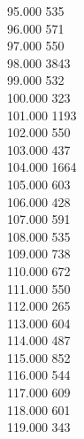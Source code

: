 { 95.000	535 \\
 96.000	571 \\
 97.000	550 \\
 98.000	3843 \\
 99.000	532 \\
 100.000	323 \\
 101.000	1193 \\
 102.000	550 \\
 103.000	437 \\
 104.000	1664 \\
 105.000	603 \\
 106.000	428 \\
 107.000	591 \\
 108.000	535 \\
 109.000	738 \\
 110.000	672 \\
 111.000	550 \\
 112.000	265 \\
 113.000	604 \\
 114.000	487 \\
 115.000	852 \\
 116.000	544 \\
 117.000	609 \\
 118.000	601 \\
 119.000	343 \\
}
